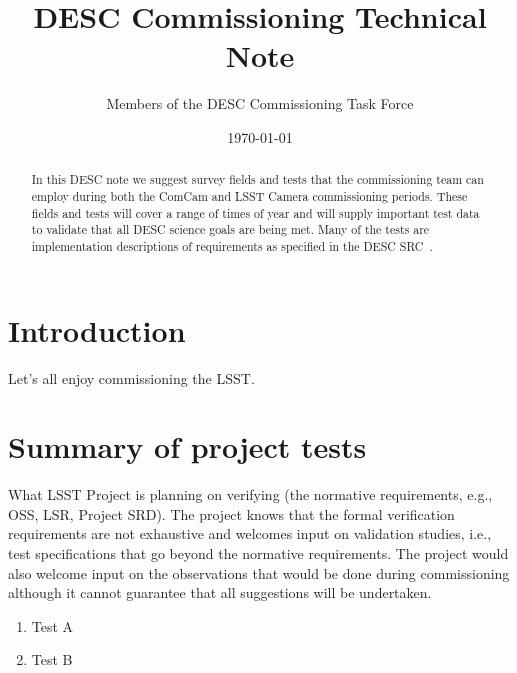 \documentclass[modern]{desc-tex/styles/lsstdescnote}
\begin{document}
\title{DESC Commissioning Technical Note}
\author{Members of the DESC Commissioning Task Force}
\date{\today}

\begin{abstract}
  In this DESC note we suggest survey fields and tests that the
  commissioning team can employ during both the ComCam and LSST Camera
  commissioning periods. These fields and tests will cover a range of
  times of year and will supply important test data to validate that
  all DESC science goals are being met. Many of the tests are
  implementation descriptions of requirements as specified in the DESC
  SRC~\cite{DESC-SRD}. \end{abstract}
\maketitle

\noindent
\begin{center}
  \fboxsep=5pt  
 \end{center} 
\vspace{0.1in}

\section{Introduction}

Let's all enjoy commissioning the LSST.

\section{Summary of project tests}

What LSST Project is planning on verifying (the normative
requirements, e.g., OSS, LSR, Project SRD). The project knows that the
formal verification requirements are not exhaustive and welcomes input
on validation studies, i.e., test specifications that go beyond the
normative requirements. The project would also welcome input on the
observations that would be done during commissioning although it
cannot guarantee that all suggestions will be undertaken.


\begin{enumerate}
\item Test A
\item Test B
\end{enumerate}
\end{document}
